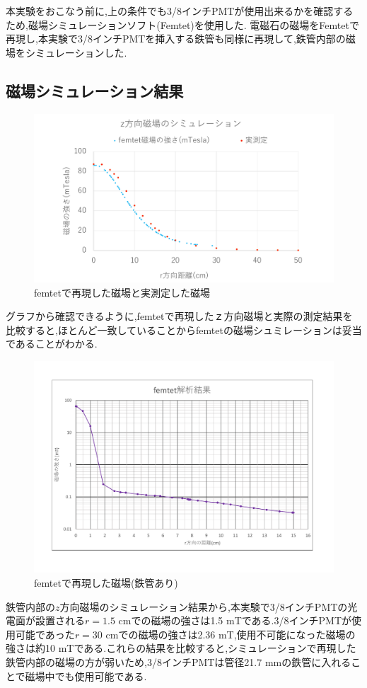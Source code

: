 本実験をおこなう前に,上の条件でも3/8インチPMTが使用出来るかを確認するため,磁場シミュレーションソフト(Femtet)を使用した.
電磁石の磁場をFemtetで再現し,本実験で3/8インチPMTを挿入する鉄管も同様に再現して,鉄管内部の磁場をシミュレーションした.

\subsection{磁場シミュレーション結果}
\begin{figure}[h]
	\centering
		\includegraphics[width=16cm]{fig/iguchi/magnetgraph2.pdf}
	\caption{femtetで再現した磁場と実測定した磁場}
	\label{magnetgraph2}
\end{figure}

グラフから確認できるように,femtetで再現した$ｚ$方向磁場と実際の測定結果を比較すると,ほとんど一致していることからfemtetの磁場シュミレーションは妥当であることがわかる.
\begin{figure}[H]
	\centering
		\includegraphics[width=15cm]{fig/iguchi/femtetsaigengraph.pdf}
	\caption{femtetで再現した磁場(鉄管あり)}
	\label{femtetsaigengraph}
\end{figure}
鉄管内部の$z$方向磁場のシミュレーション結果から,本実験で3/8インチPMTの光電面が設置される$r=1.5$ cmでの磁場の強さは1.5 mTである.3/8インチPMTが使用可能であった$r=30$ cmでの磁場の強さは2.36 mT,使用不可能になった磁場の強さは約10 mTである.これらの結果を比較すると,シミュレーションで再現した鉄管内部の磁場の方が弱いため,3/8インチPMTは管径21.7 mmの鉄管に入れることで磁場中でも使用可能である.

